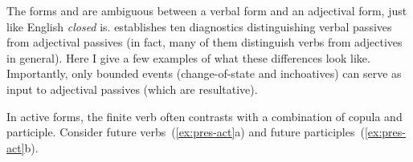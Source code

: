 \begin{exe}
\begin{xlist}
\begin{exe}
\begin{xlist}
\begin{exe}
\begin{exe}
\begin{xlist}
\begin{exe}
\begin{exe}
\begin{xlist}
\begin{exe}
\begin{xlist}
\begin{exe}
\begin{xlist}
\begin{exe}
\begin{xlist}
\begin{exe}
\begin{xlist}
\begin{xlist}
\begin{exe}
\begin{xlist}
\begin{exe}
\begin{xlist}
\begin{exe}
\begin{exe}
\begin{exe}
\begin{xlist}
\begin{exe}
\begin{exe}
\begin{xlist}
	
	
 \z
\z 

The forms {\mpua} and {\mhuf} are ambiguous between a verbal form and an adjectival form, just like English \emph{closed} is. \cite{doron00} establishes ten diagnostics distinguishing verbal passives from adjectival passives (in fact, many of them distinguish verbs from adjectives in general). Here I give a few examples of what these differences look like. Importantly, only bounded events (change-of-state and inchoatives) can serve as input to adjectival passives (which are resultative).

In active forms, the finite verb often contrasts with a combination of copula and participle. Consider future verbs~(\ref{ex:pres-act}a) and future participles~(\ref{ex:pres-act}b).
 \begin{exe}
 \ex  \label{ex:pres-act} 
 \begin{xlist} 
 
 

\end{xlist}
\end{exe}
\end{xlist}
\end{exe}
\end{exe}
\end{xlist}
\end{exe}
\end{exe}
\end{exe}
\end{xlist}
\end{exe}
\end{xlist}
\end{exe}
\end{xlist}
\end{xlist}
\end{exe}
\end{xlist}
\end{exe}
\end{xlist}
\end{exe}
\end{xlist}
\end{exe}
\end{xlist}
\end{exe}
\end{exe}
\end{xlist}
\end{exe}
\end{exe}
\end{xlist}
\end{exe}
\end{xlist}
\end{exe}
